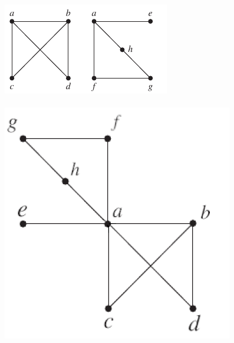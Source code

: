 \begin{itemize}
            \includegraphics[]{img/10_2_58Q_graph.png}\\
            \answer \\
            \includegraphics[scale = 0.65]{img/10_2_58A_graph.png}



\end{itemize}

